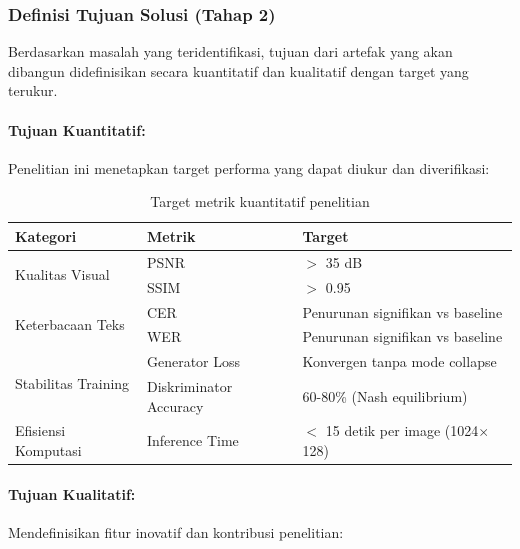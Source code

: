 \documentclass[12pt,a4paper]{article}
\begin{document}
\subsubsection{Definisi Tujuan Solusi (Tahap 2)}
Berdasarkan masalah yang teridentifikasi, tujuan dari artefak yang akan dibangun didefinisikan secara kuantitatif dan kualitatif dengan target yang terukur.

\paragraph{Tujuan Kuantitatif:}

Penelitian ini menetapkan target performa yang dapat diukur dan diverifikasi:

\begin{table}[H]
\centering
\caption{Target metrik kuantitatif penelitian}
\label{tab:target-metrik}
\small
\begin{tabular}{|l|l|l|}
\hline
\textbf{Kategori} & \textbf{Metrik} & \textbf{Target} \\ \hline
\multirow{2}{*}{Kualitas Visual} & PSNR & $>$ 35 dB \\ \cline{2-3}
 & SSIM & $>$ 0.95 \\ \hline
\multirow{2}{*}{Keterbacaan Teks} & CER & Penurunan signifikan vs baseline \\ \cline{2-3}
 & WER & Penurunan signifikan vs baseline \\ \hline
\multirow{2}{*}{Stabilitas Training} & Generator Loss & Konvergen tanpa mode collapse \\ \cline{2-3}
 & Diskriminator Accuracy & 60-80\% (Nash equilibrium) \\ \hline
Efisiensi Komputasi & Inference Time & $<$ 15 detik per image (1024$\times$128) \\ \hline
\end{tabular}
\end{table}

\paragraph{Tujuan Kualitatif:}

Mendefinisikan fitur inovatif dan kontribusi penelitian:
\end{document}
